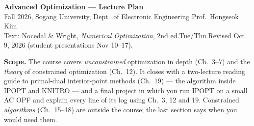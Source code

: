 \documentclass[10pt,a4paper]{article}
\begin{document}
{\LARGE\bfseries Advanced Optimization --- Lecture Plan}\\[0.2em]
{\large Fall 2026, Sogang University, Dept.\ of Electronic Engineering \quad Prof.\ Hongseok Kim}\\[0.2em]
{\small Text: Nocedal \& Wright, \emph{Numerical Optimization}, 2nd ed.\quad Tue/Thu.\quad Revised Oct 9, 2026
(student presentations Nov 10--17).}

\textbf{Scope.} The course covers \emph{unconstrained} optimization in depth (Ch.~3--7) and the \emph{theory} of
constrained optimization (Ch.~12). It closes with a two-lecture reading guide to primal-dual interior-point
methods (Ch.~19) --- the algorithm inside IPOPT and KNITRO --- and a final project in which you run IPOPT on a
small AC OPF and explain every line of its log using Ch.~3, 12 and 19. Constrained \emph{algorithms}
(Ch.~15--18) are outside the course; the last section says when you would need them.
\end{document}
